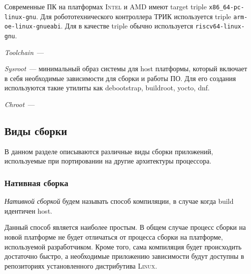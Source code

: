 Современные ПК на платформах \textsc{Intel} и \textsc{AMD} имеют target triple \texttt{x86\_64-pc-linux-gnu}.
Для робототехнического контроллера ТРИК используется triple \texttt{arm-oe-linux-gnueabi}.
Для \riscv{} в качестве triple обычно используется \texttt{riscv64-linux-gnu}.

\begin{definition}[Toolchain]
	\textit{Toolchain}~--- 
\end{definition}

\begin{definition}[Sysroot]
	\textit{Sysroot}~--- минимальный образ системы для host платформы, который включает в себя необходимые зависимости для сборки и работы ПО. 
	Для его создания используются такие утилиты как debootstrap, buildroot, yocto, dnf. 
\end{definition}

\begin{definition}[Chroot]
	\textit{Chroot}~--- 
\end{definition}


\subsection{Виды сборки}

В данном разделе описываются различные виды сборки приложений, используемые при портировании на другие архитектуры процессора.


\subsubsection{Нативная сборка}

\begin{definition}
	\textit{Нативной сборкой} будем называть способ компиляции, в случае когда build идентичен host.
\end{definition}

Данный способ является наиболее простым.
В общем случае процесс сборки на новой платформе не будет отличаться от процесса сборки на платформе, используемой разработчиком.
Кроме того, сама компиляция будет происходить достаточно быстро, а необходимые приложению зависимости будут доступны в репозиториях установленного дистрибутива \textsc{Linux}.

